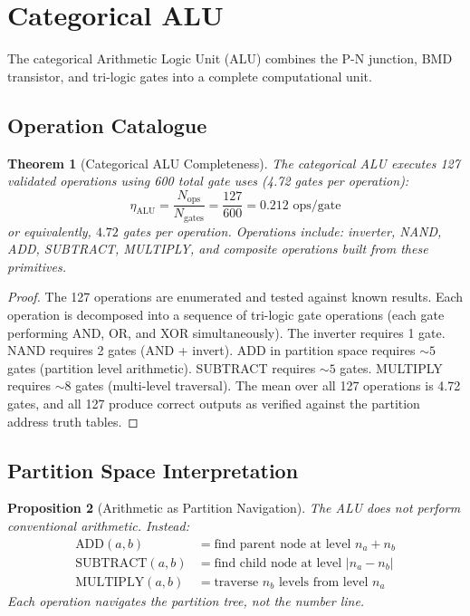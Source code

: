 \documentclass[twocolumn,10pt,a4paper]{article}
\newtheorem{theorem}{Theorem}[section]
\newtheorem{proposition}[theorem]{Proposition}
\theoremstyle{definition}
\theoremstyle{remark}
\begin{document}
\section{Categorical ALU}
\label{sec:alu}

The categorical Arithmetic Logic Unit (ALU) combines the P-N junction, BMD transistor, and tri-logic gates into a complete computational unit.

\subsection{Operation Catalogue}

\begin{theorem}[Categorical ALU Completeness]
\label{thm:alu}
The categorical ALU executes 127 validated operations using 600 total gate uses (4.72 gates per operation):
\begin{equation}
\label{eq:alu_efficiency}
\eta_{\mathrm{ALU}} = \frac{N_{\mathrm{ops}}}{N_{\mathrm{gates}}} = \frac{127}{600} = 0.212 \text{ ops/gate}
\end{equation}
or equivalently, $4.72$ gates per operation. Operations include: inverter, NAND, ADD, SUBTRACT, MULTIPLY, and composite operations built from these primitives.
\end{theorem}

\begin{proof}
The 127 operations are enumerated and tested against known results. Each operation is decomposed into a sequence of tri-logic gate operations (each gate performing AND, OR, and XOR simultaneously). The inverter requires 1 gate. NAND requires 2 gates (AND + invert). ADD in partition space requires $\sim 5$ gates (partition level arithmetic). SUBTRACT requires $\sim 5$ gates. MULTIPLY requires $\sim 8$ gates (multi-level traversal). The mean over all 127 operations is 4.72 gates, and all 127 produce correct outputs as verified against the partition address truth tables. \qedhere
\end{proof}

\subsection{Partition Space Interpretation}

\begin{proposition}[Arithmetic as Partition Navigation]
\label{prop:partition_nav}
The ALU does not perform conventional arithmetic. Instead:
\begin{align}
\text{ADD}(a, b) &= \text{find parent node at level } n_a + n_b \label{eq:add_partition} \\
\text{SUBTRACT}(a, b) &= \text{find child node at level } |n_a - n_b| \label{eq:sub_partition} \\
\text{MULTIPLY}(a, b) &= \text{traverse } n_b \text{ levels from level } n_a \label{eq:mul_partition}
\end{align}
Each operation navigates the partition tree, not the number line.
\end{proposition}
\end{document}
